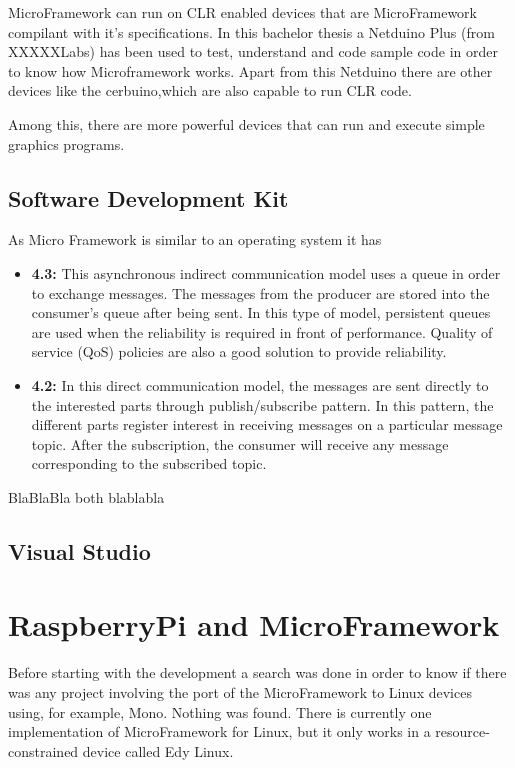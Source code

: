 MicroFramework can run on CLR enabled devices that are MicroFramework compilant with it's specifications. In this bachelor thesis a Netduino Plus (from XXXXXLabs) has been used to test, understand and code sample code in order to know how Microframework works. Apart from this Netduino there are other devices like the cerbuino,which are also capable to run CLR code.

Among this, there are more powerful devices that can run and execute simple graphics programs.


\subsection{Software Development Kit}\label{SS:MicroFramework-SDK}
As Micro Framework is similar to an operating system it has

\begin{itemize}
\item \textbf{4.3:} This asynchronous indirect communication model uses a queue in order to exchange messages. The messages from the producer are stored into the consumer's queue after being sent. In this type of model, persistent queues are used when the reliability is required in front of performance. Quality of service (QoS) policies are also a good solution to provide reliability.

\item \textbf{4.2:} In this direct communication model, the messages are sent directly to the interested parts through publish/subscribe pattern. In this pattern, the different parts register interest in receiving messages on a particular message topic. After the subscription, the consumer will receive any message corresponding to the subscribed topic.

\end{itemize}

BlaBlaBla both blablabla

\subsection{Visual Studio}\label{SS:MicroFramework-IDE}

\section{RaspberryPi and MicroFramework}\label{S:RaspberryPi-NETMF}
Before starting with the development a search was done in order to know if there was any project involving the port of the MicroFramework to Linux devices using, for example, Mono. Nothing was found.
There is currently one implementation of MicroFramework for Linux, but it only works in a resource-constrained device called Edy Linux.

